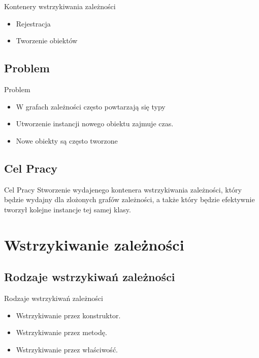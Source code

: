 \documentclass{beamer}
\begin{document}
\begin{frame}{Kontenery wstrzykiwania zależności}
\begin{itemize}
	\item Rejestracja
	\item Tworzenie obiektów
\end{itemize}
\end{frame}

\subsection*{Problem}

\begin{frame}{Problem}
  \begin{itemize}
  \item
  	W grafach zależności często powtarzają się typy
  \item
  	Utworzenie instancji nowego obiektu zajmuje czas.
  \item
  	Nowe obiekty są często tworzone
  \end{itemize}
\end{frame}

\subsection*{Cel Pracy}

\begin{frame}{Cel Pracy}
Stworzenie wydajenego kontenera wstrzykiwania zależności, który będzie wydajny dla zlożonych grafów zależności, a także który będzie efektywnie tworzył kolejne instancje tej samej klasy.
\end{frame}


\section{Wstrzykiwanie zależności}

\subsection*{Rodzaje wstrzykiwań zależności}

\begin{frame}{Rodzaje wstrzykiwań zależności}
\begin{itemize}
	\item Wstrzykiwanie przez konstruktor.
	\item Wstrzykiwanie przez metodę.
	\item Wstrzykiwanie przez właściwość.
\end{itemize}
\end{frame}
\end{document}
